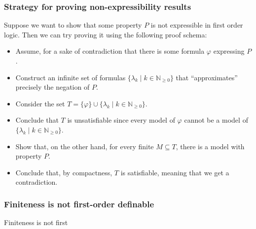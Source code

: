 \documentclass{beamer}
\def\N{\mathbb{N}_{\ge 0}}
\def\N{\mathbb{N}_{\ge 0}}
\begin{document}
\begin{frame}
	\frametitle{Strategy for proving non-expressibility results}
	Suppose we want to show that some property \alert{$ P $ is not expressible} in first order logic. Then we can try proving it using the following proof schema:
	\begin{itemize}
		\item<1-> Assume, for a sake of contradiction that there is some formula $ \varphi $ expressing $ P $.
		\item<2-> Construct an infinite set of formulas $ \{\lambda_k \mid k \in \N\} $ that ``approximates'' precisely the negation of $ P $.
		\item<3-> Consider the set $ T = \{\varphi\} \cup \{\lambda_k \mid k \in \N\} $.
		\item<4-> Conclude that $ T $ is unsatisfiable since every model of $ \varphi $ cannot be a model of $ \{\lambda_k \mid k \in \N\} $.
		\item<5-> Show that, on the other hand, for every finite $ M \subseteq T $, there is a model with property $ P $.
		\item<6-> Conclude that, by compactness, $ T $ is satisfiable, meaning that we get a contradiction.
	\end{itemize}
\end{frame}

\begin{frame}
	\frametitle{Finiteness is not first-order definable}
	Finiteness is not first
\end{frame}
	
\end{document}
